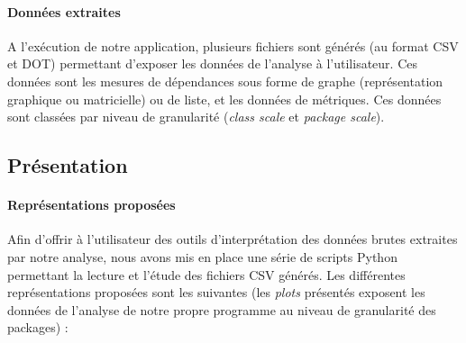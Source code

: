 \documentclass{scrartcl}
\begin{document}
    \paragraph{Données extraites}A l'exécution de notre application, plusieurs fichiers sont générés (au format CSV et DOT) permettant d'exposer les données de l'analyse à l'utilisateur. Ces données sont les mesures de dépendances sous forme de graphe (représentation graphique ou matricielle) ou de liste, et les données de métriques. Ces données sont classées par niveau de granularité (\emph{class scale} et \emph{package scale}).

\subsection{Présentation}

    \paragraph{Représentations proposées}Afin d'offrir à l'utilisateur des outils d'interprétation des données brutes extraites par notre analyse, nous avons mis en place une série de scripts Python permettant la lecture et l'étude des fichiers CSV générés. Les différentes représentations proposées sont les suivantes (les \emph{plots} présentés exposent les données de l'analyse de notre propre programme au niveau de granularité des packages) :
\end{document}
